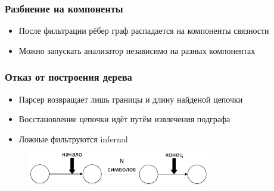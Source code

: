 \documentclass{beamer}
\begin{document}
    \begin{frame}
        \frametitle{Разбиение на компоненты}
        \begin{itemize}
            \item После фильтрации рёбер граф распадается на компоненты связности
            \item Можно запускать анализатор независимо на разных компонентах
        \end{itemize}
    \end{frame}
    
    \begin{frame}
        \frametitle{Отказ от построения дерева}
        \begin{itemize}
            \item Парсер возвращает лишь границы и длину найденой цепочки
            \item Восстановление цепочки идёт путём извлечения подграфа
            \item Ложные фильтруются infernal
        \end{itemize}
        
        \begin{figure}[b]
            \centering
            \includegraphics[width=8cm]{pictures/noTree.pdf}  
        \end{figure}
    \end{frame}
\end{document}

